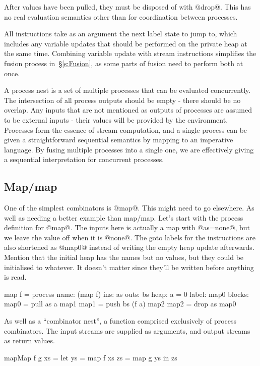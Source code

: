After values have been pulled, they must be disposed of with @drop@.
This has no real evaluation semantics other than for coordination between processes.

All instructions take as an argument the next label state to jump to, which includes any variable updates that should be performed on the private heap at the same time.
Combining variable update with stream instructions simplifies the fusion process in~\S\ref{s:Fusion}, as some parts of fusion need to perform both at once.


A process nest is a set of multiple processes that can be evaluated concurrently.
The intersection of all process outputs should be empty - there should be no overlap.
Any inputs that are not mentioned as outputs of processes are assumed to be external inputs - their values will be provided by the environment.
Processes form the essence of stream computation, and a single process can be given a straightforward sequential semantics by mapping to an imperative language.
By fusing multiple processes into a single one, we are effectively giving a sequential interpretation for concurrent processes.


\subsection{Map/map}
\label{s:Process:MapMap}

One of the simplest combinators is @map@.
This might need to go elsewhere.
As well as needing a better example than map/map.
Let's start with the process definition for @map@.
The inputs here is actually a map with @as=none@, but we leave the value off when it is @none@.
The goto labels for the instructions are also shortened as @map0@ instead of writing the empty heap update afterwards.
Mention that the initial heap has the names but no values, but they could be initialised to whatever.
It doesn't matter since they'll be written before anything is read.

\begin{code}
map f = process
    name: (map f)
     ins: as
    outs: bs
    heap: {a = 0}
   label: map0
  blocks: map0 = pull as    a  map1
          map1 = push bs (f a) map2
          map2 = drop as       map0
\end{code}

As well as a ``combinator nest'', a function comprised exclusively of process combinators.
The input streams are supplied as arguments, and output streams as return values.
\begin{code}
mapMap f g xs
 = let ys = map f xs
       zs = map g ys
   in  zs
\end{code}

